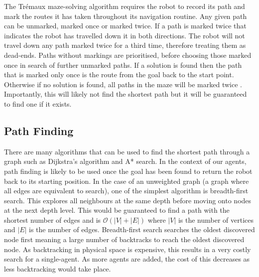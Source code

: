 The Trémaux maze-solving algorithm requires the robot to record its 
path and mark the routes it has taken throughout its navigation routine. Any 
given path  can be unmarked, marked once or marked twice. If a path is marked 
twice that indicates the robot has travelled down it in both directions. The 
robot will not travel down any path marked twice for a third time, therefore 
treating them as dead-ends. Paths without markings are prioritised, before 
choosing those marked once in search of further unmarked paths. If a 
solution is found then the path that is marked only once is the route 
from the goal back to the start point. Otherwise if no solution is found,
all paths in the maze will be marked twice \cite{even2011graph}.
Importantly, this will likely not find the shortest path but it will be 
guaranteed to find one if it exists.

\subsection{Path Finding}\label{litreview/maze/path}
There are many algorithms that can be used to find the shortest path 
through a graph such as Dijkstra's algorithm and A* search. In the 
context of our agents, path finding is likely to be used once 
the goal has been found to return the robot back to its starting 
position. In the case of an unweighted graph (a graph where all edges are 
equivalent to search), one of the simplest algorithm 
is breadth-first search. This explores all neighbours at the same depth 
before moving onto nodes at the next depth level. This would be guaranteed 
to find a path with the shortest number of edges and is $\mathcal{O}(|V| + |E|)$ 
where $|V|$ is the number of vertices and $|E|$ is the number of edges. \cite{cormen2009introduction}
Breadth-first search searches the oldest discovered node first meaning 
a large number of backtracks to reach the oldest discovered node. As 
backtracking in physical space is expensive, this results in a very 
costly search for a single-agent. As more agents are added, the cost of this 
decreases as less backtracking would take place. 

